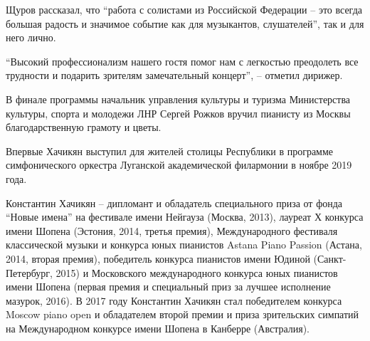 Щуров рассказал, что \enquote{работа с солистами из Российской Федерации – это всегда
большая радость и значимое событие как для музыкантов, слушателей}, так и для
него лично.

\enquote{Высокий профессионализм нашего гостя помог нам с легкостью преодолеть все
трудности и подарить зрителям замечательный концерт}, – отметил дирижер.

В финале программы начальник управления культуры и туризма Министерства
культуры, спорта и молодежи ЛНР Сергей Рожков вручил пианисту из Москвы
благодарственную грамоту и цветы.

Впервые Хачикян выступил для жителей столицы Республики в программе
симфонического оркестра Луганской академической филармонии в ноябре 2019 года.

Константин Хачикян – дипломант и обладатель специального приза от фонда \enquote{Новые
имена} на фестивале имени Нейгауза (Москва, 2013), лауреат Х конкурса имени
Шопена (Эстония, 2014, третья премия), Международного фестиваля классической
музыки и конкурса юных пианистов Astana Piano Passion (Астана, 2014, вторая
премия), победитель конкурса пианистов имени Юдиной (Санкт-Петербург, 2015) и
Московского международного конкурса юных пианистов имени Шопена (первая премия
и специальный приз за лучшее исполнение мазурок, 2016). В 2017 году Константин
Хачикян стал победителем конкурса Moscow piano open и обладателем второй премии
и приза зрительских симпатий на Международном конкурсе имени Шопена в Канберре
(Австралия).
